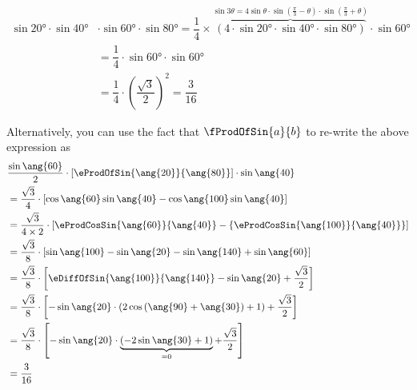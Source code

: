 \begin{solution}[\halfpage]
	\begin{fullwidth}
    \begin{align}
       \sin\ang{20}\cdot\sin\ang{40}&\cdot\sin\ang{60}\cdot\sin\ang{80} = 
       \dfrac{1}{4}\times\overbrace{(4\cdot\sin\ang{20}\cdot\sin\ang{40}\cdot\sin\ang{80})}
       ^{\sin 3\theta = 4\sin\theta\cdot\sin\left( \frac{\pi}{3} - \theta\right)\cdot\sin\left(\frac{\pi}{3} +
        \theta\right)}\cdot\sin\ang{60} \\
       &= \dfrac{1}{4}\cdot\sin\ang{60}\cdot\sin\ang{60} \\
       &= \dfrac{1}{4}\cdot\left(\dfrac{\sqrt{3}}{2} \right)^2 = \dfrac{3}{16}
    \end{align}
    
    Alternatively, you can use the fact that $\fProdOfSin{a}{b}$ to re-write the above expression as
    \begin{align}
    	&\dfrac{\sin\ang{60}}{2}\cdot\left[ \eProdOfSin{\ang{20}}{\ang{80}}\right]\cdot\sin\ang{40} \\
    	&= \dfrac{\sqrt{3}}{4}\cdot\left[ \cos\ang{60}\sin\ang{40} - \cos\ang{100}\sin\ang{40}\right] \\
    	&= \dfrac{\sqrt{3}}{4\times 2}\cdot\left[ \eProdCosSin{\ang{60}}{\ang{40}} - 
         \left\lbrace\eProdCosSin{\ang{100}}{\ang{40}}\right\rbrace\right] \\
    	&= \dfrac{\sqrt{3}}{8}\cdot\left[ \sin\ang{100}-\sin\ang{20}-\sin\ang{140} + \sin\ang{60} \right] \\
    	&= \dfrac{\sqrt{3}}{8}\cdot\left[ \eDiffOfSin{\ang{100}}{\ang{140}} - \sin\ang{20} + \dfrac{\sqrt{3}}{2} \right]\\
    	&= \dfrac{\sqrt{3}}{8}\cdot\left[ -\sin\ang{20}\cdot(2\cos{(\ang{90} + \ang{30})} + 1) 
    	+ \dfrac{\sqrt{3}}{2} \right] \\
    	&= \dfrac{\sqrt{3}}{8}\cdot\left[ -\sin\ang{20}\cdot\underbrace{(-2\sin\ang{30} + 1)}_{ = 0 } 
    	+ \dfrac{\sqrt{3}}{2} \right] \\
    	&= \dfrac{3}{16}
    \end{align}
    \end{fullwidth}
\end{solution}
